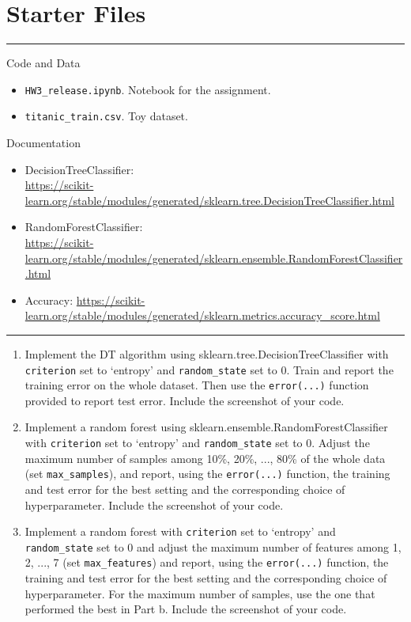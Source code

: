 \documentclass[11pt]{article}
\begin{document}
\section*{Starter Files}
\vspace{-\baselineskip}
\rule{\textwidth}{1pt}
Code and Data
\begin{itemize}[nolistsep]
    \item \verb|HW3_release.ipynb|. Notebook for the assignment.
    \item \verb|titanic_train.csv|. Toy dataset.
\end{itemize}
Documentation
\begin{itemize}[nolistsep]
\item DecisionTreeClassifier: \\{\footnotesize \url{https://scikit-learn.org/stable/modules/generated/sklearn.tree.DecisionTreeClassifier.html}}
\item RandomForestClassifier: \\{\footnotesize \url{https://scikit-learn.org/stable/modules/generated/sklearn.ensemble.RandomForestClassifier.html}}
\item Accuracy: {\footnotesize \url{https://scikit-learn.org/stable/modules/generated/sklearn.metrics.accuracy_score.html}}
\end{itemize}
\vspace{-\baselineskip}
\rule{\textwidth}{1pt}

\begin{enumerate}
    \item {} Implement the DT algorithm using sklearn.tree.DecisionTreeClassifier with \verb|criterion| set to `entropy' and \verb|random_state| set to 0. Train and report the training error on the whole dataset. Then use the \verb|error(...)| function provided to report test error. Include the screenshot of your code.
    \vspace{4cm}
    
    \item {} Implement a random forest using sklearn.ensemble.RandomForestClassifier with \verb|criterion| set to `entropy' and \verb|random_state| set to 0. Adjust the maximum number of samples among 10\%, 20\%, ..., 80\% of the whole data (set \verb|max_samples|), and report, using the \verb|error(...)| function, the training and test error for the best setting and the corresponding choice of hyperparameter. Include the screenshot of your code.
    \vspace{4cm}
    
    \item {} Implement a random forest with \verb|criterion| set to `entropy' and \verb|random_state| set to 0 and adjust the maximum number of features among 1, 2, ..., 7 (set \verb|max_features|) and report, using the \verb|error(...)| function, the training and test error for the best setting and the corresponding choice of hyperparameter. For the maximum number of samples, use the one that performed the best in Part b. Include the screenshot of your code.
    
\end{enumerate}
\end{document}
